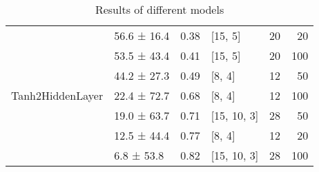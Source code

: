 \begin{table*}
\begin{tabular}{llrlrr}
 \multirow{7}{*}{Tanh2HiddenLayer} & 56.6 ± 16.4 &  0.38 & [15, 5]        &         20 &       20 \\
                                   & 53.5 ± 43.4 &  0.41 & [15, 5]        &         20 &      100 \\
                                   & 44.2 ± 27.3 &  0.49 & [8, 4]         &         12 &       50 \\
                                   & 22.4 ± 72.7 &  0.68 & [8, 4]         &         12 &      100 \\
                                   & 19.0 ± 63.7 &  0.71 & [15, 10, 3]    &         28 &       50 \\
                                   & 12.5 ± 44.4 &  0.77 & [8, 4]         &         12 &       20 \\
                                   & 6.8 ± 53.8  &  0.82 & [15, 10, 3]    &         28 &      100 \\
\hline
\end{tabular}
        \caption{Results of different models}
        \label{models}
    \end{table*}
    
